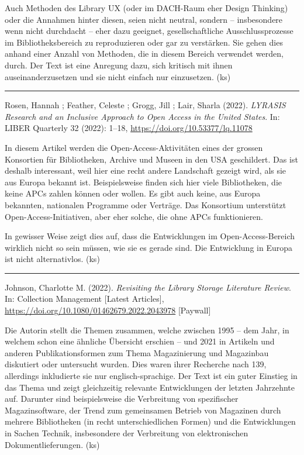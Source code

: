 \documentclass[a4paper,
fontsize=11pt,
oneside,
numbers=noperiodatend,
parskip=half-,
bibliography=totoc,
final
]{scrartcl}
\begin{document}
Auch Methoden des Library UX (oder im DACH-Raum eher Design Thinking)
oder die Annahmen hinter diesen, seien nicht neutral, sondern --
insbesondere wenn nicht durchdacht -- eher dazu geeignet,
gesellschaftliche Ausschlussprozesse im Bibliotheksbereich zu
reproduzieren oder gar zu verstärken. Sie gehen dies anhand einer Anzahl
von Methoden, die in diesem Bereich verwendet werden, durch. Der Text
ist eine Anregung dazu, sich kritisch mit ihnen auseinanderzusetzen und
sie nicht einfach nur einzusetzen. (ks)

\begin{center}\rule{0.5\linewidth}{0.5pt}\end{center}

Rosen, Hannah ; Feather, Celeste ; Grogg, Jill ; Lair, Sharla (2022).
\emph{LYRASIS Research and an Inclusive Approach to Open Access in the
United States}. In: LIBER Quarterly 32 (2022): 1--18,
\url{https://doi.org/10.53377/lq.11078}

In diesem Artikel werden die Open-Access-Aktivitäten eines der grossen
Konsortien für Bibliotheken, Archive und Museen in den USA geschildert.
Das ist deshalb interessant, weil hier eine recht andere Landschaft
gezeigt wird, als sie aus Europa bekannt ist. Beispielsweise finden sich
hier viele Bibliotheken, die keine APCs zahlen können oder wollen. Es
gibt auch keine, aus Europa bekannten, nationalen Programme oder
Verträge. Das Konsortium unterstützt Open-Access-Initiativen, aber eher
solche, die ohne APCs funktionieren.

In gewisser Weise zeigt dies auf, dass die Entwicklungen im
Open-Access-Bereich wirklich nicht so sein müssen, wie sie es gerade
sind. Die Entwicklung in Europa ist nicht alternativlos. (ks)

\begin{center}\rule{0.5\linewidth}{0.5pt}\end{center}

Johnson, Charlotte M. (2022). \emph{Revisiting the Library Storage
Literature Review}. In: Collection Management {[}Latest Articles{]},
\url{https://doi.org/10.1080/01462679.2022.2043978} {[}Paywall{]}

Die Autorin stellt die Themen zusammen, welche zwischen 1995 -- dem
Jahr, in welchem schon eine ähnliche Übersicht erschien -- und 2021 in
Artikeln und anderen Publikationsformen zum Thema Magazinierung und
Magazinbau diskutiert oder untersucht wurden. Dies waren ihrer Recherche
nach 139, allerdings inkludierte sie nur englisch-sprachige. Der Text
ist ein guter Einstieg in das Thema und zeigt gleichzeitig relevante
Entwicklungen der letzten Jahrzehnte auf. Darunter sind beispielsweise
die Verbreitung von spezifischer Magazinsoftware, der Trend zum
gemeinsamen Betrieb von Magazinen durch mehrere Bibliotheken (in recht
unterschiedlichen Formen) und die Entwicklungen in Sachen Technik,
insbesondere der Verbreitung von elektronischen Dokumentlieferungen.
(ks)
\end{document}
